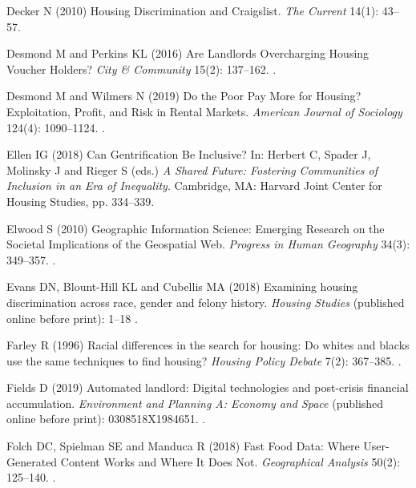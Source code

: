\documentclass[11pt,letterpaper]{article}
\begin{document}
\begin{thebibliography}{77}
	Decker N (2010) Housing {Discrimination} and {Craigslist}.
	\newblock \emph{The Current} 14(1): 43--57.
	
	Desmond M and Perkins KL (2016) Are {Landlords} {Overcharging} {Housing}
	{Voucher} {Holders}?
	\newblock \emph{City \& Community} 15(2): 137--162.
	\newblock {}.
	
	Desmond M and Wilmers N (2019) Do the {Poor} {Pay} {More} for {Housing}?
	{Exploitation}, {Profit}, and {Risk} in {Rental} {Markets}.
	\newblock \emph{American Journal of Sociology} 124(4): 1090--1124.
	\newblock {}.
	
	Ellen IG (2018) Can {Gentrification} {Be} {Inclusive}?
	\newblock In: Herbert C, Spader J, Molinsky J and Rieger S (eds.) \emph{A
		{Shared} {Future}: {Fostering} {Communities} of {Inclusion} in an {Era} of
		{Inequality}}. Cambridge, MA: Harvard Joint Center for Housing Studies, pp.
	334--339.
	
	Elwood S (2010) Geographic {Information} {Science}: {Emerging} {Research} on
	the {Societal} {Implications} of the {Geospatial} {Web}.
	\newblock \emph{Progress in Human Geography} 34(3): 349--357.
	\newblock {}.
	
	Evans DN, Blount-Hill KL and Cubellis MA (2018) Examining housing
	discrimination across race, gender and felony history.
	\newblock \emph{Housing Studies} (published online before print): 1--18 .
	
	Farley R (1996) Racial differences in the search for housing: {Do} whites and
	blacks use the same techniques to find housing?
	\newblock \emph{Housing Policy Debate} 7(2): 367--385.
	\newblock {}.
	
	Fields D (2019) Automated landlord: {Digital} technologies and post-crisis
	financial accumulation.
	\newblock \emph{Environment and Planning A: Economy and Space} (published online before print):
	0308518X1984651.
	\newblock {}.
	
	Folch DC, Spielman SE and Manduca R (2018) Fast {Food} {Data}: {Where}
	{User}-{Generated} {Content} {Works} and {Where} {It} {Does} {Not}.
	\newblock \emph{Geographical Analysis} 50(2): 125--140.
	\newblock {}.
	

\end{thebibliography}
\end{document}
